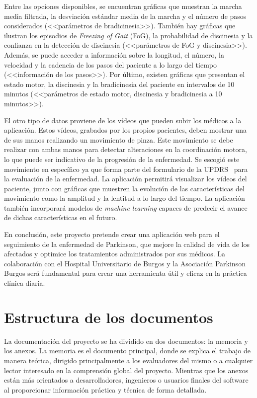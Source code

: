 Entre las opciones disponibles, se encuentran gráficas que muestran la marcha media filtrada, la desviación estándar media de la marcha y el número de pasos considerados (<<parámetros de bradicinesia>>). También hay gráficas que ilustran los episodios de \textit{Freezing of Gait} (FoG), la probabilidad de discinesia y la confianza en la detección de discinesia (<<parámetros de FoG y discinesia>>). Además, se puede acceder a información sobre la longitud, el número, la velocidad y la cadencia de los pasos del paciente a lo largo del tiempo (<<información de los pasos>>). Por último, existen gráficas que presentan el estado motor, la discinesia y la bradicinesia del paciente en intervalos de 10 minutos (<<parámetros de estado motor, discinesia y bradicinesia a 10 minutos>>).

El otro tipo de datos proviene de los vídeos que pueden subir los médicos a la aplicación. Estos vídeos, grabados por los propios pacientes, deben mostrar una de sus manos realizando un movimiento de pinza. Este movimiento se debe realizar con ambas manos para detectar alteraciones en la coordinación motora, lo que puede ser indicativo de la progresión de la enfermedad. Se escogió este movimiento en específico ya que forma parte del formulario de la UPDRS~\cite{updrs} para la evaluación de la enfermedad. La aplicación permitirá visualizar los vídeos del paciente, junto con gráficas que muestren la evolución de las características del movimiento como la amplitud y la lentitud a lo largo del tiempo. La aplicación también incorporará modelos de \textit{machine learning} capaces de predecir el avance de dichas características en el futuro.

En conclusión, este proyecto pretende crear una aplicación web para el seguimiento de la enfermedad de Parkinson, que mejore la calidad de vida de los afectados y optimice los tratamientos administrados por sus médicos. La colaboración con el Hospital Universitario de Burgos y la Asociación Parkinson Burgos será fundamental para crear una herramienta útil y eficaz en la práctica clínica diaria.


\section{Estructura de los documentos}

La documentación del proyecto se ha dividido en dos documentos: la memoria y los anexos. La memoria es el documento principal, donde se explica el trabajo de manera teórica, dirigido principalmente a los evaluadores del mismo o a cualquier lector interesado en la comprensión global del proyecto. Mientras que los anexos están más orientados a desarrolladores, ingenieros o usuarios finales del software al proporcionar información práctica y técnica de forma detallada.


